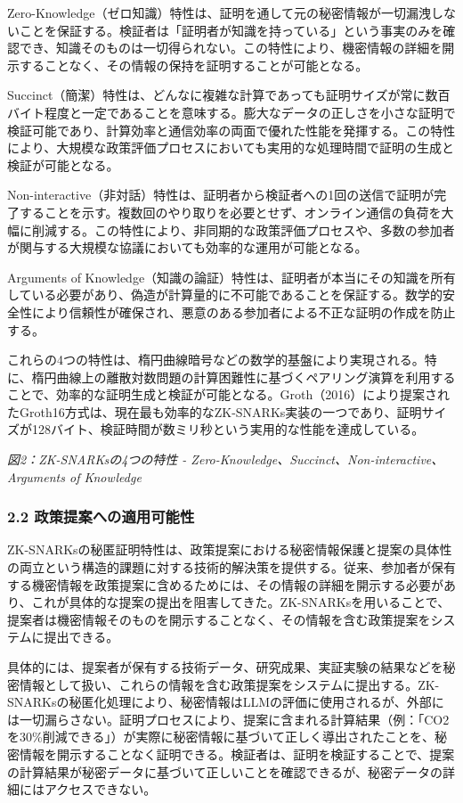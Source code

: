Zero-Knowledge（ゼロ知識）特性は、証明を通して元の秘密情報が一切漏洩しないことを保証する。検証者は「証明者が知識を持っている」という事実のみを確認でき、知識そのものは一切得られない。この特性により、機密情報の詳細を開示することなく、その情報の保持を証明することが可能となる。

Succinct（簡潔）特性は、どんなに複雑な計算であっても証明サイズが常に数百バイト程度と一定であることを意味する。膨大なデータの正しさを小さな証明で検証可能であり、計算効率と通信効率の両面で優れた性能を発揮する。この特性により、大規模な政策評価プロセスにおいても実用的な処理時間で証明の生成と検証が可能となる。

Non-interactive（非対話）特性は、証明者から検証者への1回の送信で証明が完了することを示す。複数回のやり取りを必要とせず、オンライン通信の負荷を大幅に削減する。この特性により、非同期的な政策評価プロセスや、多数の参加者が関与する大規模な協議においても効率的な運用が可能となる。

Arguments of Knowledge（知識の論証）特性は、証明者が本当にその知識を所有している必要があり、偽造が計算量的に不可能であることを保証する。数学的安全性により信頼性が確保され、悪意のある参加者による不正な証明の作成を防止する。

これらの4つの特性は、楕円曲線暗号などの数学的基盤により実現される。特に、楕円曲線上の離散対数問題の計算困難性に基づくペアリング演算を利用することで、効率的な証明生成と検証が可能となる。Groth（2016）により提案されたGroth16方式は、現在最も効率的なZK-SNARKs実装の一つであり、証明サイズが128バイト、検証時間が数ミリ秒という実用的な性能を達成している。

\pandocbounded{}
\emph{図2：ZK-SNARKsの4つの特性 - Zero-Knowledge、Succinct、Non-interactive、Arguments of Knowledge}

\subsubsection{2.2 政策提案への適用可能性}\label{ux653fux7b56ux63d0ux6848ux3078ux306eux9069ux7528ux53efux80fdux6027}

ZK-SNARKsの秘匿証明特性は、政策提案における秘密情報保護と提案の具体性の両立という構造的課題に対する技術的解決策を提供する。従来、参加者が保有する機密情報を政策提案に含めるためには、その情報の詳細を開示する必要があり、これが具体的な提案の提出を阻害してきた。ZK-SNARKsを用いることで、提案者は機密情報そのものを開示することなく、その情報を含む政策提案をシステムに提出できる。

具体的には、提案者が保有する技術データ、研究成果、実証実験の結果などを秘密情報として扱い、これらの情報を含む政策提案をシステムに提出する。ZK-SNARKsの秘匿化処理により、秘密情報はLLMの評価に使用されるが、外部には一切漏らさない。証明プロセスにより、提案に含まれる計算結果（例：「CO2を30\%削減できる」）が実際に秘密情報に基づいて正しく導出されたことを、秘密情報を開示することなく証明できる。検証者は、証明を検証することで、提案の計算結果が秘密データに基づいて正しいことを確認できるが、秘密データの詳細にはアクセスできない。


